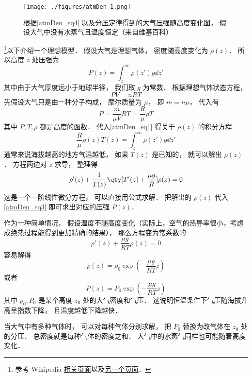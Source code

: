 

\begin{figure}[ht]
\centering
\texttt{[image: ./figures/atmDen\_1.png]}
\caption{根据\autoref{atmDen_eq4}  以及分压定律得到的大气压强随高度变化图， 假设大气中没有水蒸气且温度恒定（来自维基百科）}\label{atmDen_fig1}
\end{figure}

\footnote{参考 Wikipedia \href{https://en.wikipedia.org/wiki/Atmospheric_pressure}{相关页面}以及\href{https://en.wikipedia.org/wiki/International_Standard_Atmosphere}{另一个页面}．}以下介绍一个理想模型． 假设大气是理想气体， 密度随高度变化为 $\rho(z)$． 所以高度 $z$ 处压强为
\begin{equation}\label{atmDen_eq1}
P(z) = \int_{z}^\infty \rho(z') g \dd{z'}
\end{equation}
其中由于大气厚度远小于地球半径， 我们取 $g$ 为常数． 根据理想气体状态方程，
\begin{equation}
PV = n R T
\end{equation}
先假设大气只是由一种分子构成， 摩尔质量为 $\mu$， 即 $m = n\mu$， 代入有
\begin{equation}\label{atmDen_eq3}
P = \frac{m}{\mu V} RT = \frac{R}{\mu} \rho T
\end{equation}
其中 $P, T, \rho$ 都是高度的函数． 代入\autoref{atmDen_eq1} 得关于 $\rho(z)$ 的积分方程 %
\begin{equation}
\frac{R}{\mu} \rho(z) T(z) = \int_{z}^\infty \rho(z') g \dd{z'}
\end{equation}
通常来说海拔越高的地方气温越低， 如果 $T(z)$ 是已知的， 就可以解出 $\rho(z)$． 方程两边对 $z$ 求导， 整理得
\begin{equation}\label{atmDen_eq5}
\rho'(z)  +  \frac{1}{T(z)}\qty[T'(z) + \frac{\mu g}{R}]\rho(z) = 0
\end{equation}
这是一个一阶线性微分方程， 可以直接用公式求解． 把解出的 $\rho(z)$ 代入\autoref{atmDen_eq3} 即可求出对应的压强 $P(z)$．

作为一种简单情况， 假设温度不随高度变化（实际上，空气的热导率很小，考虑成绝热过程能得到更加精确的结果）， 那么方程变为常系数的
\begin{equation}
\rho'(z)  +  \frac{\mu g}{RT}\rho(z) = 0
\end{equation}
容易解得
\begin{equation}\label{atmDen_eq2}
\rho(z) = \rho_0\exp(-\frac{\mu g}{RT} z)
\end{equation}
或者
\begin{equation}\label{atmDen_eq4}
P(z) = P_0\exp(-\frac{\mu g}{RT} z)
\end{equation}
其中 $\rho_0, P_0$ 是某个高度 $z_0$ 处的大气密度和气压． 这说明恒温条件下气压随海拔升高呈指数下降， 且温度越低下降越快．

当大气中有多种气体时， 可以对每种气体分别求解， 把 $P_0$ 替换为改气体在 $z_0$ 处的分压． 总密度就是每种气体的密度之和． 大气中的水蒸气同样也可能随着高度变化．

